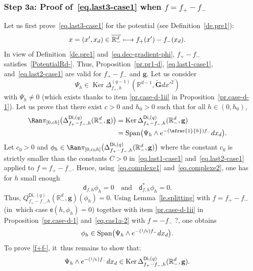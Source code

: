 \documentclass[JEP,XML,SOM,Unicode,NoEqCountersInSection,NoFloatCountersInSection,published]{cedram}
\newcommand{\Psfrac}[2]{(\sfrac{#1}{#2})}
\newcommand\mto{\mathchoice{\longmapsto}{\mapsto}{\mapsto}{\mapsto}}
\newcommand{\quand}{\quad\text{and}\quad}
\DeclareMathOperator{\Span}{Span}
\newcommand{\mbf}[1]{\mathbf{#1}}
\DeclareMathOperator\Ker{Ker}
\theoremstyle{plain}
\theoremstyle{definition}
\begin{document}
\subsubsection*{Step 3a: Proof of~\eqref{eq.last3-case1} when $f=f_+-f_-$}
Let us first prove~\eqref{eq.last3-case1} for the potential (see Definition~\ref{de.pre1}):
\[
x=(x',x_d)\in \overline{\mathbb R^d_-}\mto f_+(x') -f_-(x_d).
\]
In view of Definition~\ref{de.pre1} and~\eqref{eq.dec-gradient-phi}, $f_+ -f_-$ satisfies~\ref{PotentialRd-}. Thus,
Proposition~\ref{pr.pr1-d}, \eqref{eq.last1-case1},
and~\eqref{eq.last2-case1} are valid for $f_+ -f_-$ and $ \mbf
g$. Let us consider
\[
\Psi_h \in \Ker \Delta_{f_+,h}^{(q-1)}(\mathbb
R^{d-1}, \tilde{\mbf G}dx'^2)
\]
with
$\Psi_h\neq 0$ (which exists thanks to item \eqref{pr.case-d-1ii} in Proposition~\ref{pr.case-d-1}).
Let us prove that there exist $c>0$ and $h_0>0$ such that for all
$h\in (0,h_0)$,
\begin{equation}\label{f+f-}
\begin{aligned}
\Ran \pi_{[0,ch]}\bigl(\Delta_{f_+ -f_-,h}^{\mathsf{Di},(q)}(\mathbb R_-^d, { \mbf g})\bigr)&=\Ker \Delta_{f_+
-f_-,h}^{\mathsf{Di},(q)}(\mathbb R_-^d, { \mbf g})\\
& =\Span \bigl(\Psi_h \wedge e^{-\Psfrac 1h f_- }dx_d\bigr).
\end{aligned}
\end{equation}
Let $c_0>0$ and $\phi_h\in \Ran \pi_{[0,c_0h]}\bigl(\Delta_{f_+-f_-,h}^{\mathsf{Di},(q)}(\mathbb R_-^d, \mbf g)
\bigr)$ where the constant $c_0$ is strictly smaller than the
constants $C>0$ in~\eqref{eq.last1-case1} and~\eqref{eq.last2-case1}
applied to $f=f_+ -f_-$. Hence, using~\eqref{eq.complexe1} and~\eqref{eq.complexe2}, one has for $h$ small enough
\[
\mathsf d_{f,h}\phi_h= 0 \quand \mathsf d_{f,h}^*\phi_h=0.
\]
Thus, $Q_{f_+-f_-,h}^{\mathsf{Di},(q)}(\mathbb R_-^d, \mbf g)(\phi_h)=0$. Using Lemma~\ref{le.splitting} with $f=f_+-f_-$ (in~which
case $\mathsf e(h,\phi_h)=0$) together with item \eqref{pr.case-d-1ii} in
Proposition~\ref{pr.case-d-1} and~\eqref{eq.cas1a-2} with $f=-f_-$ ?, one obtains
\begin{equation}\label{eq.imply-Phi}
\phi_h\in \Span \bigl(\Psi_h \wedge e^{-\Psfrac 1h f_- }dx_d\bigr).
\end{equation}
To prove \eqref{f+f-}, it~thus remains to show that:
\begin{equation}\label{=psi-1}
\Psi_h \wedge e^{-\Psfrac 1h f_- }dx_d\in \Ker \Delta_{f_+ -f_-,h}^{\mathsf{Di},(q)}(\mathbb R_-^d, { \mbf g}).
\end{equation}
\end{document}
